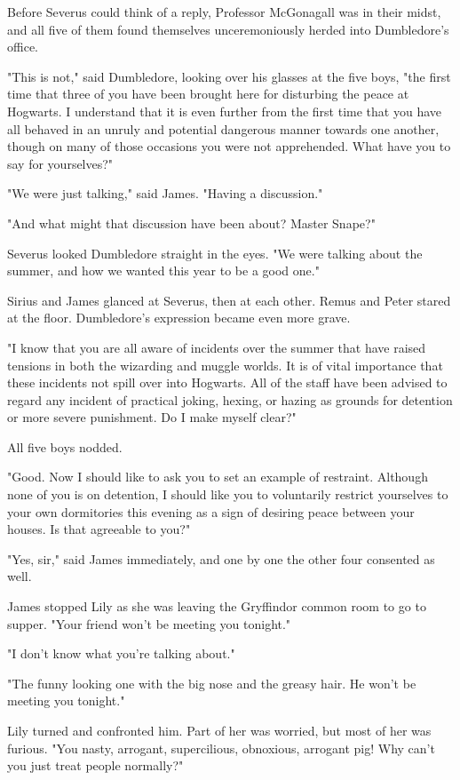 \documentclass[a4paper,11pt]{article}
\begin{document}
Before Severus could think of a reply, Professor McGonagall was in their midst, and all five of them found themselves unceremoniously herded into Dumbledore's office.

"This is not," said Dumbledore, looking over his glasses at the five boys, "the first time that three of you have been brought here for disturbing the peace at Hogwarts. I understand that it is even further from the first time that you have all behaved in an unruly and potential dangerous manner towards one another, though on many of those occasions you were not apprehended. What have you to say for yourselves?"

"We were just talking," said James. "Having a discussion."

"And what might that discussion have been about? Master Snape?"

Severus looked Dumbledore straight in the eyes. "We were talking about the summer, and how we wanted this year to be a good one."

Sirius and James glanced at Severus, then at each other. Remus and Peter stared at the floor. Dumbledore's expression became even more grave.

"I know that you are all aware of incidents over the summer that have raised tensions in both the wizarding and muggle worlds. It is of vital importance that these incidents not spill over into Hogwarts. All of the staff have been advised to regard any incident of practical joking, hexing, or hazing as grounds for detention or more severe punishment. Do I make myself clear?"

All five boys nodded.

"Good. Now I should like to ask you to set an example of restraint. Although none of you is on detention, I should like you to voluntarily restrict yourselves to your own dormitories this evening as a sign of desiring peace between your houses. Is that agreeable to you?"

"Yes, sir," said James immediately, and one by one the other four consented as well.

James stopped Lily as she was leaving the Gryffindor common room to go to supper. "Your friend won't be meeting you tonight."

"I don't know what you're talking about."

"The funny looking one with the big nose and the greasy hair. He won't be meeting you tonight."

Lily turned and confronted him. Part of her was worried, but most of her was furious. "You nasty, arrogant, supercilious, obnoxious, arrogant pig! Why can't you just treat people normally?"
\end{document}
